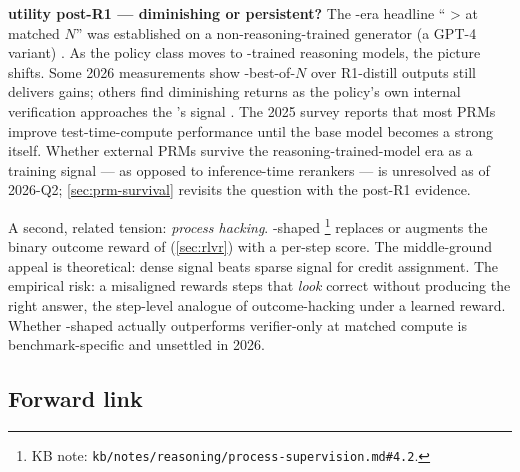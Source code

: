 \begin{contradiction}
\textbf{ utility post-R1 — diminishing or persistent?}
The -era headline `` >  at matched $N$'' was established
on a non-reasoning-trained generator (a GPT-4 variant)
\citep[\S 4]{lightman2023-prm800k}. As the policy class moves to
-trained reasoning models, the picture shifts. Some 2026
measurements show -best-of-$N$ over R1-distill outputs still
delivers gains; others find diminishing returns as the policy's own
internal verification approaches the 's signal
\citep[\S 5]{thinkprm2025}. The 2025  survey
\citep{zheng2025-prm-survey} reports that most PRMs improve
test-time-compute performance until the base model becomes a strong
 itself. Whether external PRMs survive the
reasoning-trained-model era as a training signal --- as opposed to
inference-time rerankers --- is unresolved as of 2026-Q2; \cref{sec:prm-survival}
revisits the question with the post-R1 evidence.
\end{contradiction}

A second, related tension: \emph{process hacking}. -shaped 
\citep[\S 2.4]{lightman2023-prm800k}\footnote{KB note:
\texttt{kb/notes/reasoning/process-supervision.md\#4.2}.} replaces or
augments the binary outcome reward of  (\cref{sec:rlvr}) with a
per-step  score. The middle-ground appeal is theoretical: dense
signal beats sparse signal for credit assignment. The empirical risk:
a misaligned  rewards steps that \emph{look} correct without
producing the right answer, the step-level analogue of outcome-hacking
under a learned reward. Whether -shaped  actually outperforms
verifier-only  at matched compute is benchmark-specific and
unsettled in 2026.

\subsection{Forward link}
\label{sec:prm-forward}

